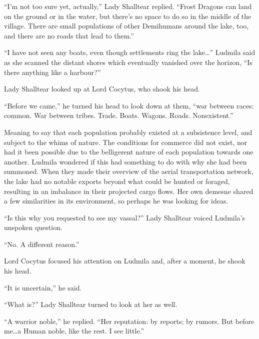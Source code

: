  

“I’m not too sure yet, actually,” Lady Shalltear replied. “Frost Dragons can land on the ground or in the water, but there’s no space to do so in the middle of the village. There are small populations of other Demihumans around the lake, too, and there are no roads that lead to them.”

 

“I have not seen any boats, even though settlements ring the lake…” Ludmila said as she scanned the distant shores which eventually vanished over the horizon, “Is there anything like a harbour?”

 

Lady Shalltear looked up at Lord Cocytus, who shook his head.

 

“Before we came,” he turned his head to look down at them, “war between races: common. War between tribes. Trade. Boats. Wagons. Roads. Nonexistent.”

 

Meaning to say that each population probably existed at a subsistence level, and subject to the whims of nature. The conditions for commerce did not exist, nor had it been possible due to the belligerent nature of each population towards one another. Ludmila wondered if this had something to do with why she had been summoned. When they made their overview of the aerial transportation network, the lake had no notable exports beyond what could be hunted or foraged, resulting in an imbalance in their projected cargo flows. Her own demesne shared a few similarities in its environment, so perhaps he was looking for ideas.

 

“Is this why you requested to see my vassal?” Lady Shalltear voiced Ludmila’s unspoken question.

 

“No. A different reason.”

 

Lord Cocytus focused his attention on Ludmila and, after a moment, he shook his head.

 

“It is uncertain,” he said.

 

“What is?” Lady Shalltear turned to look at her as well.

 

“A warrior noble,” he replied. “Her reputation: by reports; by rumors. But before me…a Human noble, like the rest. I see little.”

